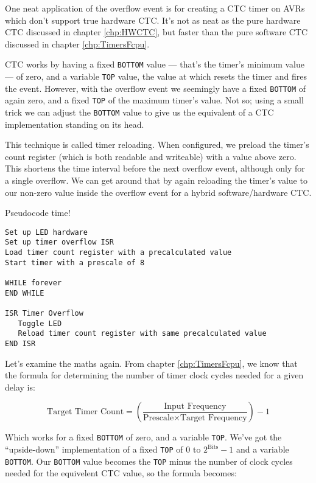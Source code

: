 \documentclass[a4paper,oneside,notitlepage]{book}
\begin{document}
One neat application of the overflow event is for creating a CTC timer on AVRs which don't support true hardware CTC. It's not as neat as the pure hardware CTC discussed in chapter \ref{chp:HWCTC}, but faster than the pure software CTC discussed in chapter \ref{chp:TimersFcpu}.

CTC works by having a fixed \texttt{BOTTOM} value --- that's the timer's minimum value --- of zero, and a variable \texttt{TOP} value, the value at which resets the timer and fires the event. However, with the overflow event we seemingly have a fixed \texttt{BOTTOM} of again zero, and a fixed \texttt{TOP} of the maximum timer's value. Not so; using a small trick we can adjust the \texttt{BOTTOM} value to give us the equivalent of a CTC implementation standing on its head.

This technique is called timer reloading. When configured, we preload the timer's count register (which is both readable and writeable) with a value above zero. This shortens the time interval before the next overflow event, although only for a single overflow. We can get around that by again reloading the timer's value to our non-zero value inside the overflow event for a hybrid software/hardware CTC.

Pseudocode time!

\begin{center}
\begin{lstlisting}[keywordstyle=\color{black},commentstyle=\color{black}]
Set up LED hardware
Set up timer overflow ISR
Load timer count register with a precalculated value
Start timer with a prescale of 8

WHILE forever
END WHILE

ISR Timer Overflow
   Toggle LED
   Reload timer count register with same precalculated value
END ISR
\end{lstlisting}
\end{center}

Let's examine the maths again. From chapter \ref{chp:TimersFcpu}, we know that the formula for determining the number of timer clock cycles needed for a given delay is:

\begin{displaymath}
\text{Target Timer Count} = (\frac{\text{Input Frequency}}{\text{Prescale} \times \text{Target Frequency}}) - 1
\end{displaymath}

Which works for a fixed \texttt{BOTTOM} of zero, and a variable \texttt{TOP}. We've got the ``upside-down'' implementation of a fixed \texttt{TOP} of \(0 \text{ to } 2^\text{Bits}-1\) and a variable \texttt{BOTTOM}. Our \texttt{BOTTOM} value becomes the \texttt{TOP} minus the number of clock cycles needed for the equivelent CTC value, so the formula becomes:
\end{document}
